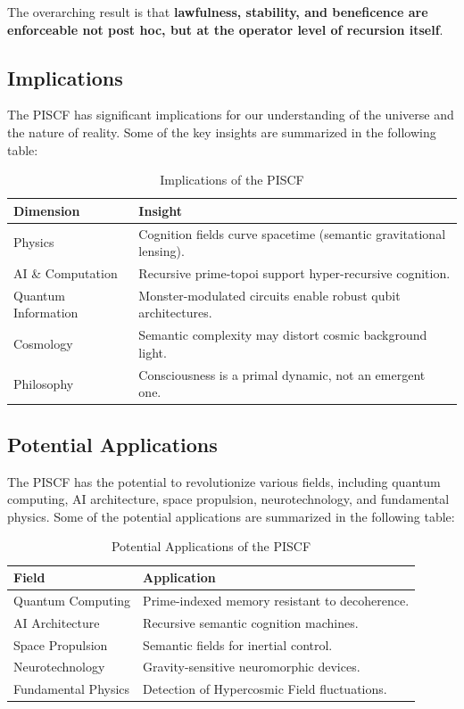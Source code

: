 \documentclass{article}
\theoremstyle{plain}
\begin{document}
The overarching result is that \textbf{lawfulness, stability, and beneficence are enforceable not post hoc, but at the operator level of recursion itself}.

\subsection{Implications}

The PISCF has significant implications for our understanding of the universe and the nature of reality. Some of the key insights are summarized in the following table:

\begin{table}[h!]
\centering
\begin{tabular}{@{}ll@{}}
\toprule
Dimension & Insight \\
\midrule
Physics & Cognition fields curve spacetime (semantic gravitational lensing). \\
AI \& Computation & Recursive prime-topoi support hyper-recursive cognition. \\
Quantum Information & Monster-modulated circuits enable robust qubit architectures. \\
Cosmology & Semantic complexity may distort cosmic background light. \\
Philosophy & Consciousness is a primal dynamic, not an emergent one. \\
\bottomrule
\end{tabular}
\caption{Implications of the PISCF}
\label{tab:implications}
\end{table}

\subsection{Potential Applications}

The PISCF has the potential to revolutionize various fields, including quantum computing, AI architecture, space propulsion, neurotechnology, and fundamental physics. Some of the potential applications are summarized in the following table:

\begin{table}[h!]
\centering
\begin{tabular}{@{}ll@{}}
\toprule
Field & Application \\
\midrule
Quantum Computing & Prime-indexed memory resistant to decoherence. \\
AI Architecture & Recursive semantic cognition machines. \\
Space Propulsion & Semantic fields for inertial control. \\
Neurotechnology & Gravity-sensitive neuromorphic devices. \\
Fundamental Physics & Detection of Hypercosmic Field fluctuations. \\
\bottomrule
\end{tabular}
\caption{Potential Applications of the PISCF}
\label{tab:applications}
\end{table}
\end{document}
